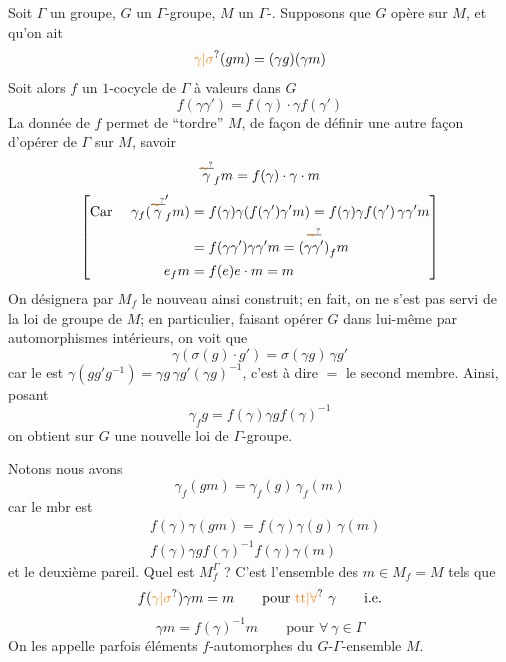 Soit $\Gamma$ un groupe, $G$ un $\Gamma$-groupe, $M$ un $\Gamma$-. Supposons que $G$ opère sur $M$, et qu'on ait
\[
\unsure{\gamma|\sigma}(gm)=(\gamma g)(\gamma m)
\]
Soit alors $f$ un $1$-cocycle de $\Gamma$ à valeurs dans $G$
\[
f(\gamma\gamma')=f(\gamma)\cdot\gamma f(\gamma')
\]
La donnée de $f$ permet de ``tordre'' $M$, de façon  de définir une autre façon d'opérer de $\Gamma$ sur $M$, savoir
\[
\overset{\deleted{\unsure{\sim}}}{\gamma}_f m=f(\gamma)\cdot\gamma\cdot m
\]
\[
\left[\begin{aligned}
\text{Car }\quad\gamma_f(\overset{\deleted{\unsure{\sim}}}{\gamma}'_f m)&=f(\gamma)\gamma(f(\gamma')\gamma'm)=f(\gamma)\gamma f(\gamma')\,\gamma\gamma'm\\
&=f(\gamma\gamma')\gamma\gamma'm=\overset{\deleted{\unsure{\sim}}}{(\gamma\gamma')}_f m\\
e_f m&=f(e)e\cdot m=m
\end{aligned}\right]
\]
On désignera par $M_f$ le nouveau  ainsi construit; en fait, on ne s'est pas servi de la loi de groupe de $M$; en particulier, faisant opérer $G$ dans lui-même par automorphismes intérieurs, on  voit que
\[
\gamma(\sigma(g)\cdot g')=\sigma(\gamma g)\,\gamma g'
\]
car le   est $\gamma(gg'g^{-1})=\gamma g\,\gamma g'(\gamma g)^{-1}$, c'est à dire $=$ le second membre. Ainsi, posant
\[
\gamma_f g=f(\gamma)\gamma g f(\gamma)^{-1}
\]
on obtient sur $G$ une nouvelle loi de $\Gamma$-groupe.

Notons   nous avons
\[
\gamma_f(gm)=\gamma_f(g)\,\gamma_f(m)
\]
car le  mbr est
\[
\begin{aligned}
&f(\gamma)\gamma(gm)=f(\gamma)\gamma(g)\,\gamma(m)\\
&f(\gamma)\gamma g f(\gamma)^{-1}f(\gamma)\gamma(m)
\end{aligned}
\]
et le deuxième  pareil.
Quel est  $M_f^\Gamma$ ? C'est l'ensemble des $m\in M_f=M$ tels que
\[
f(\unsure{\gamma|\sigma})\gamma m=m\qquad\text{pour }\unsure{\mathrm{tt}|\forall}\ \gamma\qquad\text{i.e.}
\]
\[
\boxed{\gamma m=f(\gamma)^{-1}m\qquad\text{pour }\forall\ \gamma\in\Gamma}
\]
On les appelle parfois éléments $f$-automorphes du $G$-$\Gamma$-ensemble $M$.

